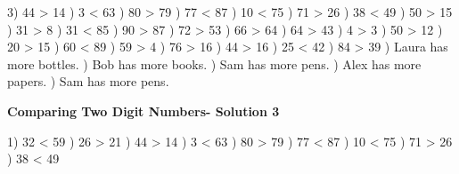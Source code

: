 \documentclass{article}%
\begin{document}
3) 44 > 14%
) 3 < 63%
) 80 > 79%
) 77 < 87%
) 10 < 75%
) 71 > 26%
) 38 < 49%
) 50 > 15%
) 31 > 8%
) 31 < 85%
) 90 > 87%
) 72 > 53%
) 66 > 64%
) 64 > 43%
) 4 > 3%
) 50 > 12%
) 20 > 15%
) 60 < 89%
) 59 > 4%
) 76 > 16%
) 44 > 16%
) 25 < 42%
) 84 > 39%
) Laura has more bottles.%
) Bob has more books.%
) Sam has more pens.%
) Alex has more papers.%
) Sam has more pens.%
\newline%
\newpage%
\large%
\begin{center}%
\textbf{Comparing Two Digit Numbers- Solution 3}%
\newline%
\end{center} \normalsize%
1) 32 < 59%
) 26 > 21%
) 44 > 14%
) 3 < 63%
) 80 > 79%
) 77 < 87%
) 10 < 75%
) 71 > 26%
) 38 < 49%
\newline%
\end{document}
